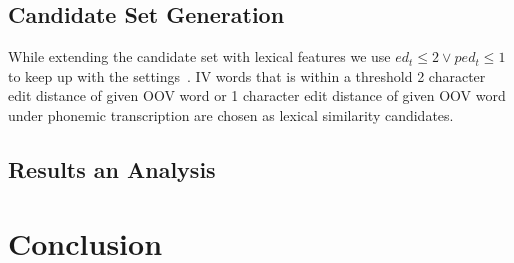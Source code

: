 \subsection{Candidate Set Generation}

While extending the candidate set with lexical features we use ${ed_t \leq 2} \vee {ped_t \leq 1}$ to keep up with the settings~\cite{Han:2011:LNS:2002472.2002520}. IV words that is within a threshold 2 character edit distance of given OOV word or 1 character edit distance of given OOV word under phonemic transcription are chosen as lexical similarity candidates.

\subsection{Results an Analysis}


\section{Conclusion}
